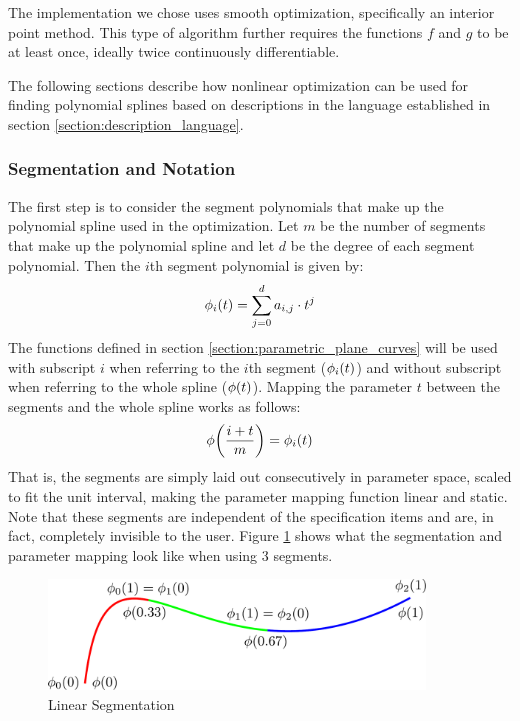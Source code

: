 \documentclass[a4paper]{article}
\begin{document}
				The implementation we chose uses smooth optimization, specifically an interior point method. This type of algorithm further requires the functions \(f\) and \(g\) to be at least once, ideally twice continuously differentiable.

				The following sections describe how nonlinear optimization can be used for finding polynomial splines based on descriptions in the language established in section \ref{section:description_language}.

			\subsubsection{Segmentation and Notation}
			\label{section:segmentation_notation}

				The first step is to consider the segment polynomials that make up the polynomial spline used in the optimization. Let \(m\) be the number of segments that make up the polynomial spline and let \(d\) be the degree of each segment polynomial. Then the \(i\)th segment polynomial is given by:
				\begin{equation*}
					\phi_i\!\left( t \right) = \sum_{j = 0}^{d} a_{i,j} \cdot t^j
				\end{equation*}
				The functions defined in section \ref{section:parametric_plane_curves} will be used with subscript \(i\) when referring to the \(i\)th segment (\(\phi_i\!\left( t \right)\)) and without subscript when referring to the whole spline (\(\phi\!\left( t \right)\)). Mapping the parameter \(t\) between the segments and the whole spline works as follows:
				\begin{equation*}
					\phi\!\left( \frac{i + t}{m} \right) = \phi_i\!\left( t \right)
				\end{equation*}
				That is, the segments are simply laid out consecutively in parameter space, scaled to fit the unit interval, making the parameter mapping function linear and static. Note that these segments are independent of the specification items and are, in fact, completely invisible to the user. Figure \ref{figure:linear_segmentation} shows what the segmentation and parameter mapping look like when using 3 segments.

				\begin{figure}[htb]
					\centering
					\includegraphics[width=100mm]{content/output/linear_segmentation.pdf}
					\caption{Linear Segmentation}
					\label{figure:linear_segmentation}
				\end{figure}
\end{document}
